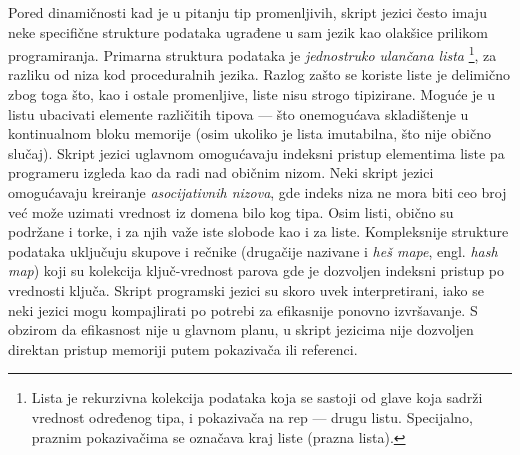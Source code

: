 Pored dinamičnosti kad je u pitanju tip promenljivih, skript jezici često imaju neke specifične strukture podataka ugrađene u sam jezik kao olakšice prilikom programiranja. Primarna struktura podataka je \emph{jednostruko ulančana lista} \footnote{Lista je rekurzivna kolekcija podataka koja se sastoji od glave koja sadrži vrednost određenog tipa, i pokazivača na rep --- drugu listu. Specijalno, praznim pokazivačima se označava kraj liste (prazna lista).}, za razliku od niza kod proceduralnih jezika. Razlog zašto se koriste liste je delimično zbog toga što, kao i ostale promenljive, liste nisu strogo tipizirane. Moguće je u listu ubacivati elemente različitih tipova --- što onemogućava skladištenje u kontinualnom bloku memorije (osim ukoliko je lista imutabilna, što nije obično slučaj). Skript jezici uglavnom omogućavaju indeksni pristup elementima liste pa programeru izgleda kao da radi nad običnim nizom. Neki skript jezici omogućavaju kreiranje \emph{asocijativnih nizova}, gde indeks niza ne mora biti ceo broj već može uzimati vrednost iz domena bilo kog tipa. Osim listi, obično su podržane i torke, i za njih važe iste slobode kao i za liste. Kompleksnije strukture podataka uključuju skupove i rečnike (drugačije nazivane i \emph{heš mape}, engl. \emph{hash map}) koji su kolekcija ključ-vrednost parova gde je dozvoljen indeksni pristup po vrednosti ključa. Skript programski jezici su skoro uvek interpretirani, iako se neki jezici mogu kompajlirati po potrebi za efikasnije ponovno izvršavanje. S obzirom da efikasnost nije u glavnom planu, u skript jezicima nije dozvoljen direktan pristup memoriji putem pokazivača ili referenci. 

